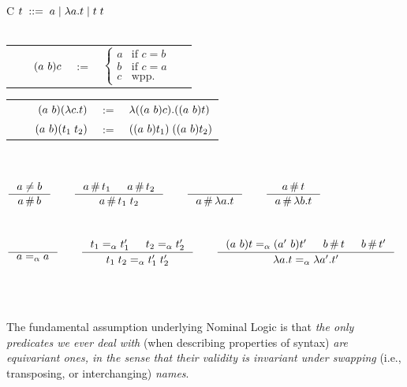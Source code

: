 \documentclass[aspectratio=169]{beamer}
\newcommand{\aequiv}{\ensuremath{=_\alpha}}
\begin{document}
\begin{frame}
  \begin{tabularx}{\textwidth}{C}
    \hspace{9cm}
      $ t \; ::= \; a \mid \lambda a . t \mid t\;t$
    \\ \\
    \begin{tabular}{rcl}
    $\qquad(a\ b) c$ & $:=$
      & $ \begin{cases}
        a & \text{if } c = b \\
        b & \text{if } c = a \\
        c & \text{wpp.}
      \end{cases}$
      $\quad$
      \\
    \end{tabular}
    \begin{tabular}{rcl}
      $\qquad$
      $(a\ b) (\lambda c . t) $ & $:=$
      & $ \lambda ((a\ b) c) . ((a\ b) t)$ \\
      $(a\ b) (t_1\; t_2) $ & $:=$
      & $ ((a\ b) t_1) \; ((a\ b) t_2) $ \\
    \end{tabular}
\\ \\ $
      \inference{
        a \cneq b
      }{
        a \cfresh b
      }
      \qquad
      \inference{
        a \cfresh t_1 & a \cfresh t_2
      }{
        a \cfresh t_1\;t_2
      }
      \qquad
      \inference{
      }{
        a \cfresh \lambda a . t
      }
      \qquad
      \inference{
        a \cfresh t
      }{
        a \cfresh \lambda b . t
      }
      $ \\ \\ \\ $
    \inference{
      \text{}
    }{
      a \aequiv a
    }
    \qquad
    \inference{
      t_1 \aequiv t_1' & t_2 \aequiv t_2'
    }{
      t_1\;t_2 \aequiv t_1'\;t_2'
    }
    \qquad
    \inference{
      \permswap{a}{b}{t} \aequiv \permswap{a'}{b}{t'} & b \cfresh t & b \cfresh t'
    }{
      \lambda a . t \aequiv \lambda a' . t'
    }
    $ \\ \\
\end{tabularx}
\\
\begin{mdframed}[frametitle={\textnormal{\scriptsize \textbf{Andrew M. Pitts}, \textit{``Nominal logic, a first order theory of names and binding''}}:}]
{\footnotesize
The fundamental assumption underlying Nominal Logic is that \textit{the only predicates we ever deal with} (when describing properties of syntax) \textit{are equivariant ones, in the sense that their validity is invariant under swapping} (i.e., transposing, or interchanging) \textit{names}.
}
\end{mdframed}
\end{frame}
\end{document}

